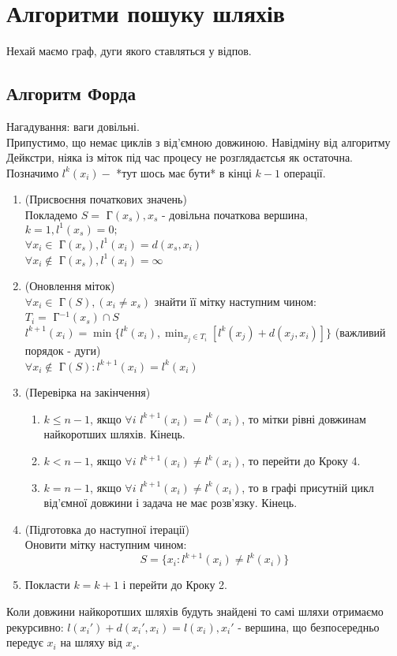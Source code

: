 \documentclass[12pt]{book}
\begin{document}
\chapter{Алгоритми пошуку шляхів}
Нехай маємо граф, дуги якого ставляться у відпов.
\section{Алгоритм Форда}
Нагадування: ваги довільні.\\
Припустимо, що немає циклів з від’ємною довжиною. Навідміну від алгоритму Дейкстри, ніяка із міток під час процесу не розглядаєтсья як остаточна.\\
Позначимо $l^k(x_i) - $ *тут шось має бути* в кінці $k-1$ операції.\\
\begin{enumerate}
\item (Присвоєння початкових значень)\\
Покладемо $S=$ Г$(x_s), x_s$ - довільна початкова вершина,\\
$k=1, l^1(x_s)=0;$\\
${\forall}x_i\in$ Г$(x_s), l^1(x_i)=d(x_s,x_i)$\\
${\forall}x_i\notin$ Г$(x_s), l^1(x_i)=\infty$
\item (Оновлення міток)\\
${\forall}x_i\in$ Г$(S), (x_i{\neq}x_s)$ знайти її мітку наступним чином:\\
$T_i=$ Г$^{-1}(x_s){\cap}S$\\
$l^{k+1}(x_i)=\min\{l^k(x_i),\displaystyle\min_{x_j{\in}T_i}[l^k(x_j)+d(x_j,x_i)]\}$ (важливий порядок - дуги)\\
${\forall}x_i\notin$ Г$(S): l^{k+1}(x_i)=l^k(x_i)$
\item (Перевірка на закінчення)
\begin{enumerate}
\item $k\leq n-1$, якщо ${\forall}i$ $l^{k+1}(x_i)=l^k(x_i)$, то мітки рівні довжинам найкоротших шляхів. Кінець.
\item $k<n-1$, якщо ${\forall}i$ $l^{k+1}(x_i)\neq l^k(x_i)$, то перейти до Кроку 4.
\item $k=n-1$, якщо ${\forall}i$ $l^{k+1}(x_i)\neq l^k(x_i)$, то в графі присутній цикл від’ємної довжини і задача не має розв’язку. Кінець.
\end{enumerate}
\item (Підготовка до наступної ітерації)\\
Оновити мітку наступним чином:
$$S=\{x_i:l^{k+1}(x_i){\neq}l^k(x_i)\}$$
\item Покласти $k=k+1$ і перейти до Кроку 2.
\end{enumerate}
Коли довжини найкоротших шляхів будуть знайдені то самі шляхи отримаємо рекурсивно:
$l(x_i')+d(x_i',x_i)=l(x_i), x_i'$ - вершина, що безпосередньо передує $x_i$ на шляху від $x_s$.
\end{document}
